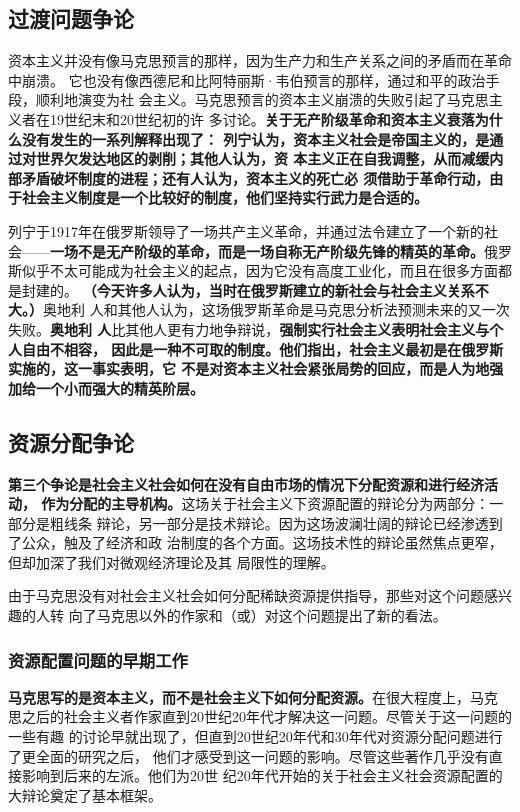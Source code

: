 \subsection{过渡问题争论}

资本主义并没有像马克思预言的那样，因为生产力和生产关系之间的矛盾而在革命中崩溃。
它也没有像西德尼和比阿特丽斯·韦伯预言的那样，通过和平的政治手段，顺利地演变为社
会主义。马克思预言的资本主义崩溃的失败引起了马克思主义者在19世纪末和20世纪初的许
多讨论。\textbf{关于无产阶级革命和资本主义衰落为什么没有发生的一系列解释出现了：
列宁认为，资本主义社会是帝国主义的，是通过对世界欠发达地区的剥削；其他人认为，资
本主义正在自我调整，从而减缓内部矛盾破坏制度的进程；还有人认为，资本主义的死亡必
须借助于革命行动，由于社会主义制度是一个比较好的制度，他们坚持实行武力是合适的。}

列宁于1917年在俄罗斯领导了一场共产主义革命，并通过法令建立了一个新的社
会——\textbf{一场不是无产阶级的革命，而是一场自称无产阶级先锋的精英的革命。}俄罗
斯似乎不太可能成为社会主义的起点，因为它没有高度工业化，而且在很多方面都是封建的。
\textbf{（今天许多人认为，当时在俄罗斯建立的新社会与社会主义关系不大。）}奥地利
人和其他人认为，这场俄罗斯革命是马克思分析法预测未来的又一次失败。\textbf{奥地利
人}比其他人更有力地争辩说，\textbf{强制实行社会主义表明社会主义与个人自由不相容，
因此是一种不可取的制度。他们指出，社会主义最初是在俄罗斯实施的，这一事实表明，它
不是对资本主义社会紧张局势的回应，而是人为地强加给一个小而强大的精英阶层。}

\subsection{资源分配争论}

\textbf{第三个争论是社会主义社会如何在没有自由市场的情况下分配资源和进行经济活动，
作为分配的主导机构。}这场关于社会主义下资源配置的辩论分为两部分：一部分是粗线条
辩论，另一部分是技术辩论。因为这场波澜壮阔的辩论已经渗透到了公众，触及了经济和政
治制度的各个方面。这场技术性的辩论虽然焦点更窄，但却加深了我们对微观经济理论及其
局限性的理解。

由于马克思没有对社会主义社会如何分配稀缺资源提供指导，那些对这个问题感兴趣的人转
向了马克思以外的作家和（或）对这个问题提出了新的看法。

\subsubsection{资源配置问题的早期工作}

\textbf{马克思写的是资本主义，而不是社会主义下如何分配资源。}在很大程度上，马克
思之后的社会主义者作家直到20世纪20年代才解决这一问题。尽管关于这一问题的一些有趣
的讨论早就出现了，但直到20世纪20年代和30年代对资源分配问题进行了更全面的研究之后，
他们才感受到这一问题的影响。尽管这些著作几乎没有直接影响到后来的左派。他们为20世
纪20年代开始的关于社会主义社会资源配置的大辩论奠定了基本框架。

